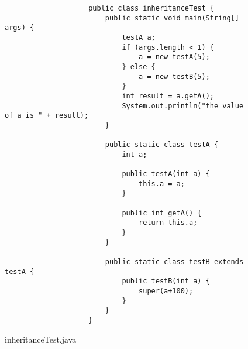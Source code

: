 \documentclass{dithesis}
\begin{document}
            \begin{figure}[H]
                \begin{lstlisting}
                    public class inheritanceTest {
                        public static void main(String[] args) {
                            testA a;
                            if (args.length < 1) {
                                a = new testA(5);
                            } else {
                                a = new testB(5);
                            }
                            int result = a.getA();
                            System.out.println("the value of a is " + result);
                        }

                        public static class testA {
                            int a;

                            public testA(int a) {
                                this.a = a;
                            }

                            public int getA() {
                                return this.a;
                            }
                        }

                        public static class testB extends testA {
                            public testB(int a) {
                                super(a+100);
                            }
                        }
                    }
                \end{lstlisting}
            \caption{inheritanceTest.java}
            \end{figure}
\end{document}
